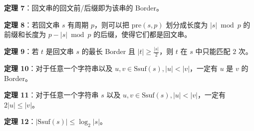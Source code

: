 \begin{tcolorbox}
\textbf{定理 7}：回文串的回文前/后缀即为该串的 Border。
\end{tcolorbox}

\begin{tcolorbox}
\textbf{定理 8}：若回文串 $s$ 有周期 $p$，则可以把 $\mathrm{pre}(s, p)$ 划分成长度为 $|s| \bmod p$ 的前缀和长度为 $p - |s| \bmod p$ 的后缀，使得它们都是回文串。
\end{tcolorbox}

\begin{tcolorbox}
\textbf{定理 9}：若 $t$ 是回文串 $s$ 的最长 Border 且 $|t| \ge \frac{|s|}{2}$，则 $t$ 在 $s$ 中只能匹配 $2$ 次。
\end{tcolorbox}

\begin{tcolorbox}
\textbf{定理 10}：对于任意一个字符串以及 $u, v\in\mathrm{Ssuf}(s), |u| < |v|$，一定有 $u$ 是 $v$ 的 Border。
\end{tcolorbox}

\begin{tcolorbox}
\textbf{定理 11}：对于任意一个字符串 $s$ 以及 $u, v\in\mathrm{Ssuf}(s), |u| < |v|$，一定有 $2|u| \le |v|$。
\end{tcolorbox}

\begin{tcolorbox}
\textbf{定理 12}：$|\mathrm{Ssuf}(s)| \le \log_2|s|$。
\end{tcolorbox}